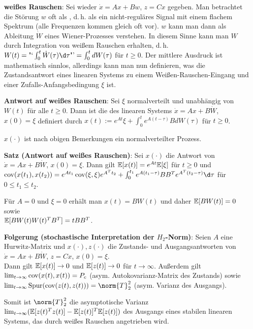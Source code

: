 \textbf{weißes Rauschen}:
Sei wieder $\dot{x} = Ax + Bw$, $z = Cx$ gegeben.
Man betrachtet die Störung $w$ oft als , d.\,h. als ein nicht-reguläres
Signal mit einem flachem Spektrum (alle Frequenzen kommen gleich oft vor).
$w$ kann man dann als Ableitung $\dot{W}$ eines Wiener-Prozesses verstehen.
In diesem Sinne kann man $W$ durch Integration von weißem Rauschen erhalten, d.\,h.
$W(t) = \text{"`}\int_0^t \dot{W}(\tau) \d\tau\text{"'} = \int_0^t dW(\tau)$ für $t \ge 0$.
Der mittlere Ausdruck ist mathematisch sinnlos, allerdings kann man nun definieren, was
die Zustandsantwort eines linearen Systems zu einem Weißen-Rauschen-Eingang und einer
Zufalls-Anfangsbedingung $\xi$ ist.

\textbf{Antwort auf weißes Rauschen}:
Sei $\xi$ normalverteilt und unabhängig von $W(t)$ für alle $t \ge 0$.
Dann ist die  des linearen Systems $\dot{x} = Ax + B\dot{W}$,
$x(0) = \xi$ definiert durch
$x(t) := e^{At}\xi + \int_0^t e^{A(t-\tau)}B dW(\tau)$ für $t \ge 0$.

$x(\cdot)$ ist nach obigen Bemerkungen ein normalverteilter Prozess.

\textbf{Satz (Antwort auf weißes Rauschen)}:
Sei $x(\cdot)$ die Antwort von $\dot{x} = Ax + B\dot{W}$, $x(0) = \xi$.
Dann gilt $\mathbb{E}[x(t)] = e^{At}\mathbb{E}[\xi]$ für $t \ge 0$ und\\
$\cov(x(t_1), x(t_2)) = e^{At_1} \cov(\xi, \xi) e^{A^T t_2} +
\int_0^{t_1} e^{A(t_1 - \tau)} BB^T e^{A^T (t_2 - \tau)} \d\tau$ für $0 \le t_1 \le t_2$.

Für $A = 0$ und $\xi = 0$ erhält man $x(t) = BW(t)$ und daher
$\mathbb{E}[BW(t)] = 0$ sowie\\
$\mathbb{E}[BW(t) W(t)^T B^T] = tBB^T$.

\linie

\textbf{Folgerung (stochastische Interpretation der $H_2$-Norm)}:
Seien $A$ eine Hurwitz-Matrix und $x(\cdot), z(\cdot)$ die Zustands- und Ausgangsantworten
von $\dot{x} = Ax + B\dot{W}$, $z = Cx$, $x(0) = \xi$.\\
Dann gilt $\mathbb{E}[x(t)] \to 0$ und $\mathbb{E}[z(t)] \to 0$ für $t \to \infty$.
Außerdem gilt\\
$\lim_{t \to \infty} \operatorname{cov}(x(t), x(t)) = P_c$ (asym. Autokovarianz-Matrix des Zustands) sowie\\
$\lim_{t \to \infty} \Spur(\cov(z(t), z(t))) = \norm{T}_2^2$ (asym. Varianz des Ausgangs).

Somit ist $\norm{T}_2^2$ die asymptotische Varianz
$\lim_{t \to \infty} (\mathbb{E}[z(t)^T z(t)] - \mathbb{E}[z(t)]^T \mathbb{E}[z(t)])$
des Ausgangs eines stabilen linearen Systems, das durch weißes Rauschen angetrieben wird.

